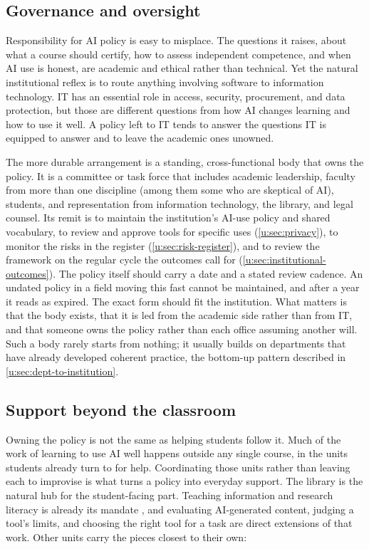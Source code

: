 \documentclass{SIAMbook2023}
\begin{document}
\subsection{Governance and oversight}
\label{u:subsec:governance}

Responsibility for AI policy is easy to misplace. The questions it raises, about what a course should certify, how to assess independent competence, and when AI use is honest, are academic and ethical rather than technical. Yet the natural institutional reflex is to route anything involving software to information technology. IT has an essential role in access, security, procurement, and data protection, but those are different questions from how AI changes learning and how to use it well. A policy left to IT tends to answer the questions IT is equipped to answer and to leave the academic ones unowned.

The more durable arrangement is a standing, cross-functional body that owns the policy. It is a committee or task force that includes academic leadership, faculty from more than one discipline (among them some who are skeptical of AI), students, and representation from information technology, the library, and legal counsel. Its remit is to maintain the institution's AI-use policy and shared vocabulary, to review and approve tools for specific uses (\cref{u:sec:privacy}), to monitor the risks in the register (\cref{u:sec:risk-register}), and to review the framework on the regular cycle the outcomes call for (\cref{u:sec:institutional-outcomes}). The policy itself should carry a date and a stated review cadence. An undated policy in a field moving this fast cannot be maintained, and after a year it reads as expired. The exact form should fit the institution. What matters is that the body exists, that it is led from the academic side rather than from IT, and that someone owns the policy rather than each office assuming another will. Such a body rarely starts from nothing; it usually builds on departments that have already developed coherent practice, the bottom-up pattern described in \cref{u:sec:dept-to-institution}.

\subsection{Support beyond the classroom}
\label{u:subsec:support}%
%

Owning the policy is not the same as helping students follow it. Much of the work of learning to use AI well happens outside any single course, in the units students already turn to for help. Coordinating those units rather than leaving each to improvise is what turns a policy into everyday support. The library is the natural hub for the student-facing part. Teaching information and research literacy is already its mandate \citep{acrl2016framework}, and evaluating AI-generated content, judging a tool's limits, and choosing the right tool for a task are direct extensions of that work. Other units carry the pieces closest to their own:
\end{document}
